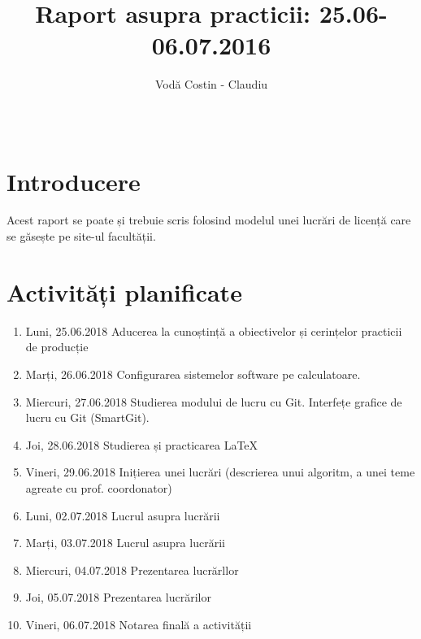 \documentclass{report}
\title{{\sc Raport asupra practicii: 25.06-06.07.2016}}
\author{Vodă Costin - Claudiu}
\date{\,}
\begin{document}
\maketitle

\tableofcontents

\chapter{Introducere}

Acest raport se poate și trebuie scris folosind modelul unei lucrări de licență care se găsește pe site-ul facultății. 






\chapter{Activități planificate}
\begin{enumerate}
\item  Luni, 25.06.2018 \newline
Aducerea la cunoștință a obiectivelor și cerințelor practicii de producție
\item  Marți, 26.06.2018 \newline
Configurarea sistemelor software pe calculatoare. 
\item  Miercuri, 27.06.2018 \newline
Studierea modului de lucru cu Git. Interfețe grafice de lucru cu Git (SmartGit).
\item  Joi, 28.06.2018 \newline
Studierea și practicarea LaTeX
\item  Vineri, 29.06.2018 \newline
 Inițierea unei lucrări (descrierea unui algoritm, a unei teme agreate cu prof. coordonator)
\item  Luni, 02.07.2018 \newline
Lucrul asupra lucrării
\item  Marți, 03.07.2018  \newline
Lucrul asupra lucrării
\item  Miercuri, 04.07.2018  \newline
Prezentarea lucrărllor
\item  Joi, 05.07.2018 \newline
Prezentarea lucrărilor
\item  Vineri, 06.07.2018  \newline
Notarea finală a activității
\end{enumerate}
\end{document}
